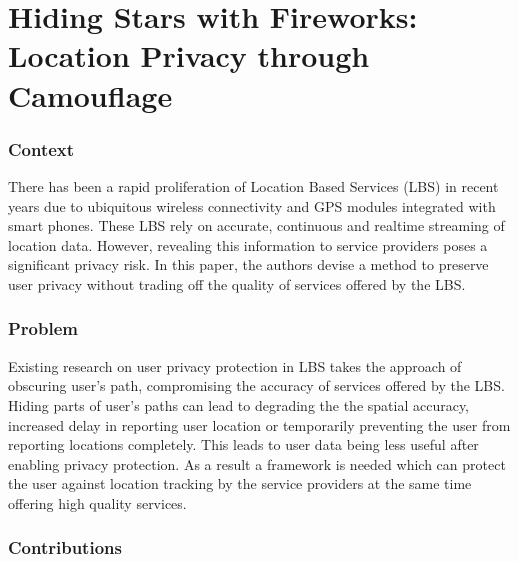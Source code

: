 \newpage
\section{Hiding Stars with Fireworks:
Location Privacy through Camouflage~\cite{Meyerowitz:2009:HSF:1614320.1614358}}\label{lect4}

\subsubsection*{Context}

There has been a rapid proliferation of Location Based Services (LBS) in recent
years due to ubiquitous wireless connectivity and GPS modules integrated with 
smart phones. These LBS rely on accurate, continuous and realtime streaming of 
location data. However, revealing this information to service providers poses a 
significant privacy risk. In this paper, the authors devise a method to preserve
user privacy without trading off the quality of services offered by the LBS. 

\subsubsection*{Problem}

Existing research on user privacy protection in LBS takes the approach of 
obscuring user's path, compromising the accuracy of services offered by the 
LBS. Hiding parts of user's paths can lead to degrading the the spatial accuracy, 
increased delay in reporting user location or temporarily preventing the user from
reporting locations completely. This leads to user data being less useful after
enabling privacy protection. As a result a framework is needed which can protect
the user against location tracking by the service providers at the same time
offering high quality services. 
  
\subsubsection*{Contributions}

